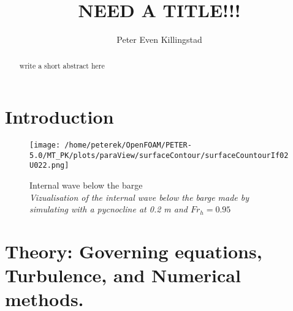 \documentclass[a4paper, 12pt]{report}
\title{NEED A TITLE!!!}
\author{Peter Even Killingstad}
\begin{document}
\masterfrontpage
\begin{abstract}
 write a short abstract here
\end{abstract}
\tableofcontents

\chapter{Introduction}
\begin{figure}[H]
	\centering
	\texttt{[image: /home/peterek/OpenFOAM/PETER-5.0/MT\_PK/plots/paraView/surfaceContour/surfaceCountourIf02U022.png]}
	\caption{Internal wave below the barge\\ \textit{Vizualisation of the internal wave below the barge made by simulating with a pycnocline at 0.2 m and $Fr_h = 0.95$}}
	\label{fig:eta}
\end{figure}
\chapter{Theory: Governing equations, Turbulence, and Numerical methods.}
\end{document}
